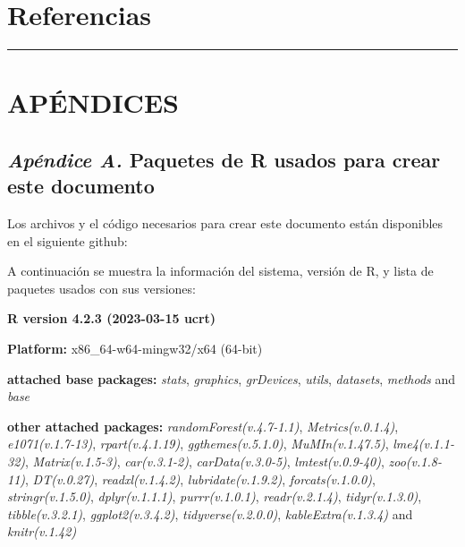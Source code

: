 \documentclass[
  11pt,
  bookmarksnumbered]{article}
\begin{document}
\newpage

\hypertarget{referencias}{%
\section*{Referencias}\label{referencias}}

\AtNextBibliography{\normalsize}
\printbibliography[heading=none]
\normalsize

\def\printbibliography{}

\begin{center}\rule{0.5\linewidth}{0.5pt}\end{center}

\hypertarget{apuxe9ndices}{%
\section*{APÉNDICES}\label{apuxe9ndices}}

\hypertarget{appendix-apuxe9ndice}{%
\appendix}


\hypertarget{paquetes-list}{%
\subsection*{\texorpdfstring{\emph{Apéndice A.} Paquetes de R usados para crear este documento}{Apéndice A. Paquetes de R usados para crear este documento}}\label{paquetes-list}}

Los archivos y el código necesarios para crear este documento están disponibles en el siguiente github:

A continuación se muestra la información del sistema, versión de R, y lista de paquetes usados con sus versiones:

\textbf{R version 4.2.3 (2023-03-15 ucrt)}

\textbf{Platform:} x86\_64-w64-mingw32/x64 (64-bit)

\textbf{attached base packages:}
\emph{stats}, \emph{graphics}, \emph{grDevices}, \emph{utils}, \emph{datasets}, \emph{methods} and \emph{base}

\textbf{other attached packages:}
\emph{randomForest(v.4.7-1.1)}, \emph{Metrics(v.0.1.4)}, \emph{e1071(v.1.7-13)}, \emph{rpart(v.4.1.19)}, \emph{ggthemes(v.5.1.0)}, \emph{MuMIn(v.1.47.5)}, \emph{lme4(v.1.1-32)}, \emph{Matrix(v.1.5-3)}, \emph{car(v.3.1-2)}, \emph{carData(v.3.0-5)}, \emph{lmtest(v.0.9-40)}, \emph{zoo(v.1.8-11)}, \emph{DT(v.0.27)}, \emph{readxl(v.1.4.2)}, \emph{lubridate(v.1.9.2)}, \emph{forcats(v.1.0.0)}, \emph{stringr(v.1.5.0)}, \emph{dplyr(v.1.1.1)}, \emph{purrr(v.1.0.1)}, \emph{readr(v.2.1.4)}, \emph{tidyr(v.1.3.0)}, \emph{tibble(v.3.2.1)}, \emph{ggplot2(v.3.4.2)}, \emph{tidyverse(v.2.0.0)}, \emph{kableExtra(v.1.3.4)} and \emph{knitr(v.1.42)}
\end{document}

